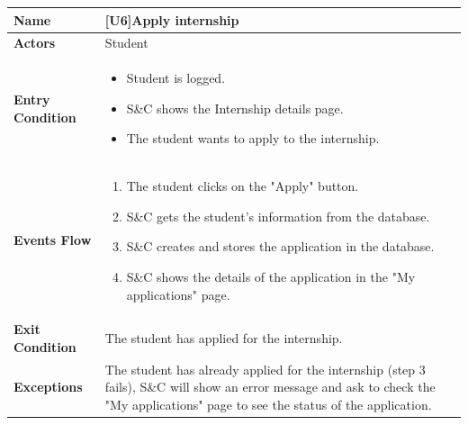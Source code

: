 \begin{center}
    \begin{tabular}{|p{9em}|p{27em}|}
        \hline
        \rowcolor{bluepoli!40} %
        \textbf{Name} & \textbf{[U6]Apply internship} \\
        \hline
        \textbf{Actors} & Student \\
        \hline
        \textbf{Entry Condition} & 
        \begin{itemize}
            \item Student is logged.
            \item S\&C shows the Internship details page.
            \item The student wants to apply to the internship.
        \end{itemize} \\
        \hline
        \textbf{Events Flow} & 
        \begin{enumerate}
            \item The student clicks on the "Apply" button.
            \item S\&C gets the student's information from the database.
            \item S\&C creates and stores the application in the database.
            \item S\&C shows the details of the application in the "My applications" page.
        \end{enumerate} \\
        \hline
        \textbf{Exit Condition} & The student has applied for the internship. \\
        \hline
        \textbf{Exceptions} & The student has already applied for the internship (step 3 fails), S\&C will show an error message and ask to
        check the "My applications" page to see the status of the application. \\
        \hline
    \end{tabular}
\end{center}

